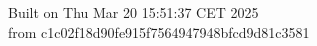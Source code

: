 {\noindent Built on Thu Mar 20 15:51:37 CET 2025} \\ 
 {\noindent from c1c02f18d90fe915f7564947948bfcd9d81c3581}
